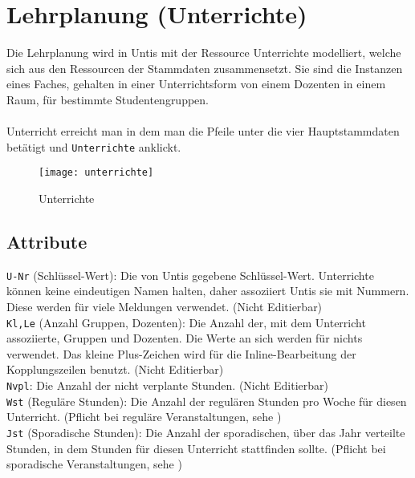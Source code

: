 
\chapter{Lehrplanung (Unterrichte)}
\label{chap:lessons}

Die Lehrplanung wird in Untis mit der Ressource Unterrichte modelliert, welche sich aus den Ressourcen der Stammdaten zusammensetzt. Sie sind die Instanzen eines Faches, gehalten in einer Unterrichtsform von einem Dozenten in einem Raum, für bestimmte Studentengruppen.\\
\\
Unterricht erreicht man in dem man die Pfeile unter die vier Hauptstammdaten betätigt und \texttt{Unterrichte} anklickt.

\begin{figure}[h]
	\centering
	\texttt{[image: unterrichte]}
	\vspace{-5pt}
	\caption{Unterrichte}
	\label{fig:unterrichte}
\end{figure}

\section{Attribute}

\noindent
\texttt{U-Nr} (Schlüssel-Wert):  Die von Untis gegebene Schlüssel-Wert. Unterrichte können keine eindeutigen Namen halten, daher assoziiert Untis sie mit Nummern. Diese werden für viele Meldungen verwendet.  (Nicht Editierbar)\\

\noindent
\texttt{Kl,Le} (Anzahl Gruppen, Dozenten):  Die Anzahl der, mit dem Unterricht assoziierte, Gruppen und Dozenten. Die Werte an sich werden für nichts verwendet. Das kleine Plus-Zeichen wird für die Inline-Bearbeitung der Kopplungszeilen benutzt. (Nicht Editierbar)\\

\noindent
\texttt{Nvpl}:  Die Anzahl der nicht verplante Stunden. (Nicht Editierbar)\\

\noindent
\texttt{Wst} (Reguläre Stunden):  Die Anzahl der regulären Stunden pro Woche für diesen Unterricht. (Pflicht bei reguläre Veranstaltungen, sehe )\\

\noindent
\texttt{Jst} (Sporadische Stunden):  Die Anzahl der sporadischen, über das Jahr verteilte Stunden, in dem Stunden für diesen Unterricht stattfinden sollte. (Pflicht bei sporadische Veranstaltungen, sehe )\\

